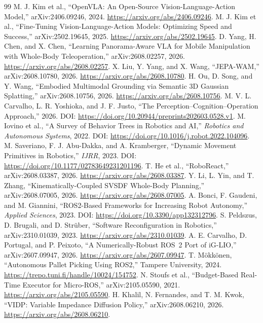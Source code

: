\documentclass[10pt,a4paper]{article}
\begin{document}
\begin{thebibliography}{99}\small
{} M. J. Kim et al., ``OpenVLA: An Open-Source Vision-Language-Action Model,'' arXiv:2406.09246, 2024. \url{https://arxiv.org/abs/2406.09246}.
 M. J. Kim et al., ``Fine-Tuning Vision-Language-Action Models: Optimizing Speed and Success,'' arXiv:2502.19645, 2025. \url{https://arxiv.org/abs/2502.19645}.
 D. Yang, H. Chen, and X. Chen, ``Learning Panorama-Aware VLA for Mobile Manipulation with Whole-Body Teleoperation,'' arXiv:2608.02257, 2026. \url{https://arxiv.org/abs/2608.02257}.
 X. Liu, Y. Yang, and X. Wang, ``JEPA-WAM,'' arXiv:2608.10780, 2026. \url{https://arxiv.org/abs/2608.10780}.
 H. Ou, D. Song, and Y. Wang, ``Embodied Multimodal Grounding via Semantic 3D Gaussian Splatting,'' arXiv:2608.10756, 2026. \url{https://arxiv.org/abs/2608.10756}.
 M. V. L. Carvalho, L. R. Yoshioka, and J. F. Justo, ``The Perception--Cognition--Operation Approach,'' 2026. DOI: \url{https://doi.org/10.20944/preprints202603.0528.v1}.
 M. Iovino et al., ``A Survey of Behavior Trees in Robotics and AI,'' \emph{Robotics and Autonomous Systems}, 2022. DOI: \url{https://doi.org/10.1016/j.robot.2022.104096}.
 M. Saveriano, F. J. Abu-Dakka, and A. Kramberger, ``Dynamic Movement Primitives in Robotics,'' \emph{IJRR}, 2023. DOI: \url{https://doi.org/10.1177/02783649231201196}.
 T. He et al., ``RoboReact,'' arXiv:2608.03387, 2026. \url{https://arxiv.org/abs/2608.03387}.
 Y. Li, L. Yin, and T. Zhang, ``Kinematically-Coupled SVSDF Whole-Body Planning,'' arXiv:2608.07005, 2026. \url{https://arxiv.org/abs/2608.07005}.
 A. Bonci, F. Gaudeni, and M. Giannini, ``ROS2-Based Frameworks for Increasing Robot Autonomy,'' \emph{Applied Sciences}, 2023. DOI: \url{https://doi.org/10.3390/app132312796}.
 S. Peldszus, D. Brugali, and D. Strüber, ``Software Reconfiguration in Robotics,'' arXiv:2310.01039, 2023. \url{https://arxiv.org/abs/2310.01039}.
 A. E. Carvalho, D. Portugal, and P. Peixoto, ``A Numerically-Robust ROS~2 Port of iG-LIO,'' arXiv:2607.09947, 2026. \url{https://arxiv.org/abs/2607.09947}.
 T. Mökkönen, ``Autonomous Pallet Picking Using ROS2,'' Tampere University, 2024. \url{https://trepo.tuni.fi/handle/10024/154752}.
 N. Stoufs et al., ``Budget-Based Real-Time Executor for Micro-ROS,'' arXiv:2105.05590, 2021. \url{https://arxiv.org/abs/2105.05590}.
 H. Khalil, N. Fernandes, and T. M. Kwok, ``VIDP: Variable Impedance Diffusion Policy,'' arXiv:2608.06210, 2026. \url{https://arxiv.org/abs/2608.06210}.

\end{thebibliography}
\end{document}
